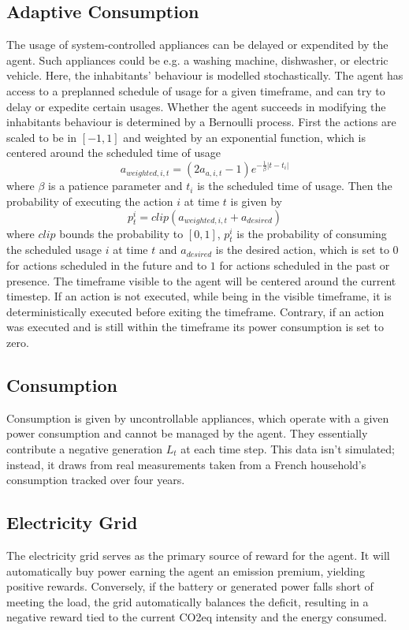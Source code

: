 \documentclass{article}
\theoremstyle{plain}
\theoremstyle{definition}
\theoremstyle{remark}
\begin{document}
\subsection{Adaptive Consumption}
The usage of system-controlled appliances can be delayed or expendited by the agent. Such appliances could be e.g. a washing machine, dishwasher, or electric vehicle. Here, the inhabitants' behaviour is modelled stochastically. The agent has access to a preplanned schedule of usage for a given timeframe, and can try to delay or expedite certain usages. Whether the agent succeeds in modifying the inhabitants behaviour is determined by a Bernoulli process. First the actions are scaled to be in $[-1,1]$ and weighted by an exponential function, which is centered around the scheduled time of usage
\begin{equation}
    a_{weighted, i, t} = (2a_{a, i, t} - 1) e^{-\frac{1}{\beta} |t - t_i|} 
\end{equation}
where $\beta$ is a patience parameter and $t_i$ is the scheduled time of usage. Then the probability of executing the action $i$ at time $t$ is given by
\begin{equation}
    p_t^i = clip(a_{weighted, i, t} + a_{desired})
\end{equation}
where $clip$ bounds the probability to $[0,1]$, $p_t^i$ is the probability of consuming the scheduled usage $i$ at time $t$ and $a_{desired}$ is the desired action, which is set to $0$ for actions scheduled in the future and to $1$ for actions scheduled in the past or presence.
The timeframe visible to the agent will be centered around the current timestep. If an action is not executed, while being in the visible timeframe, it is deterministically executed before exiting the timeframe. Contrary, if an action was executed and is still within the timeframe its power consumption is set to zero.

\subsection{Consumption}
Consumption is given by uncontrollable appliances, which operate with a given power consumption and cannot be managed by the agent. They essentially contribute a negative generation $L_t$ at each time step. This data isn't simulated; instead, it draws from real measurements taken from a French household's consumption tracked over four years.

\subsection{Electricity Grid}
The electricity grid serves as the primary source of reward for the agent. It will automatically buy power earning the agent an emission premium, yielding positive rewards. Conversely, if the battery or generated power falls short of meeting the load, the grid automatically balances the deficit, resulting in a negative reward tied to the current CO2eq intensity and the energy consumed.
\end{document}
